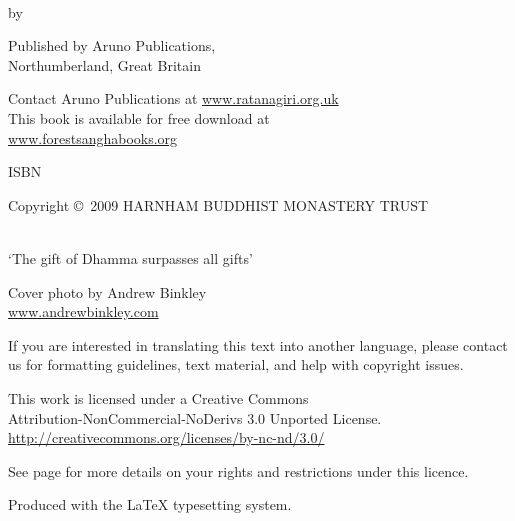 \cleartoverso
\thispagestyle{empty}
{\copyrightsize\setlength{\parskip}{0.5\baselineskip}\setlength{\parindent}{0em}%
\raggedright%
\shaker\color[gray]{0.3}

\thetitle\\
by \theauthor

Published by Aruno Publications,\\
Northumberland, Great Britain

Contact Aruno Publications at \href{http://ratanagiri.org.uk/}{www.ratanagiri.org.uk}\\
This book is available for free download at\\
\href{http://forestsanghabooks.org/}{www.forestsanghabooks.org}

ISBN \theISBN

Copyright \copyright\ 2009 HARNHAM BUDDHIST MONASTERY TRUST

\\
`The gift of Dhamma surpasses all gifts'

Cover photo by Andrew Binkley\\
\href{http://andrewbinkley.com}{www.andrewbinkley.com}

{\tiny
If you are interested in translating this text into another language, please contact us for formatting guidelines, text material, and help with copyright issues.

This work is licensed under a Creative Commons\\
Attribution-NonCommercial-NoDerivs 3.0 Unported License.\\
\href{http://creativecommons.org/licenses/by-nc-nd/3.0/}{http://creativecommons.org/licenses/by-nc-nd/3.0/}

See page \pageref{copyright-details} for more details on your rights and restrictions under this licence.

Produced with the {\selectfont\LaTeX} typesetting system.


}}

